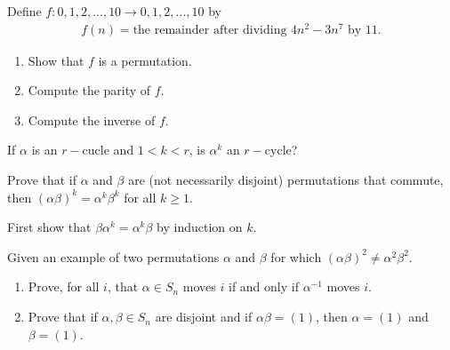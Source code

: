 \documentclass[15pt]{article}
\newenvironment{exercise}[2][Exercise]{\begin{trivlist}
\item[\hskip \labelsep {\bfseries #1}\hskip \labelsep {\bfseries #2.}]}
{\end{trivlist}}
\newenvironment{hint}[2][Hint]{\begin{trivlist}
    \item[\hskip \labelsep {\bfseries #1}\hskip \labelsep {\bfseries #2.}]}
    {\end{trivlist}}
\begin{document}
\begin{exercise}{1.18}
    Define $f:{0,1,2,...,10} \rightarrow {0,1,2,...,10}$ by 
    \begin{align*}
        f(n)= \text{the remainder after dividing } 4n^2-3n^7 \text{ by 11.}
    \end{align*}

    \begin{enumerate}
        \item[(i)] Show that $f$ is a permutation.
        \item[(ii)] Compute the parity of $f$.
        \item[(iii)] Compute the inverse of $f$.
    \end{enumerate}
    
\end{exercise}



\begin{exercise}{1.19}
    If $\alpha$ is an $r-$cucle and $1<k<r$, is $\alpha^k$ an $r-$cycle?
\end{exercise}

\begin{exercise}{1.20}
    \begin{enumerate}
        \item[(i)] Prove that if $\alpha$ and $\beta$ are (not necessarily disjoint) permutations that commute, then $(\alpha\beta)^k=\alpha^k\beta^k$ for all $k\geq1$.
        \begin{hint}{}
            First show that $\beta\alpha^k = \alpha^k \beta$ by induction on $k$.
        \end{hint}
        \item[(ii)] Given an example of two permutations $\alpha$ and $\beta$ for which $(\alpha\beta)^2\neq \alpha^2\beta^2$.
    \end{enumerate}
\end{exercise}

\begin{exercise}{1.21}
    \begin{enumerate}
        \item[(i)] Prove, for all $i$, that $\alpha \in S_n$ moves $i$ if and only if $\alpha^{-1}$ moves $i$.
        \item[(ii)] Prove that if $\alpha,\beta \in S_n$ are disjoint and if $\alpha\beta=(1)$, then $\alpha=(1)$ and $\beta=(1)$.
    \end{enumerate}
    
\end{exercise}
\end{document}
